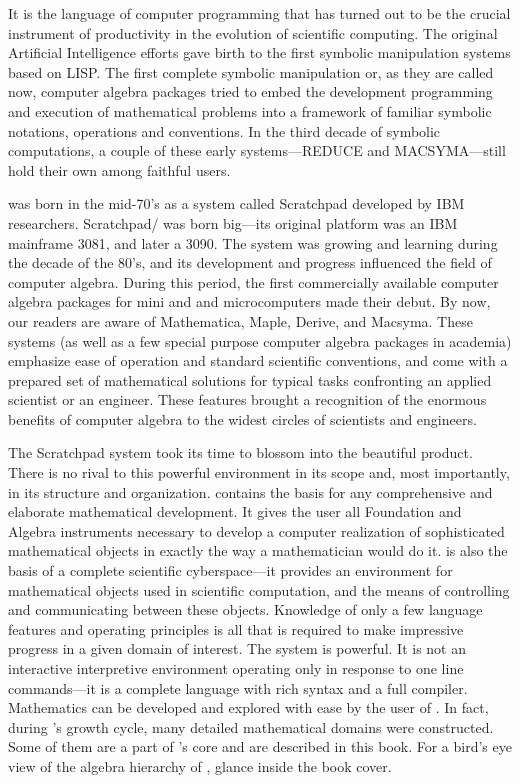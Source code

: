 It is the language of computer programming that has turned out to
be the crucial instrument of productivity in the evolution of
scientific computing.
The original Artificial Intelligence efforts gave birth to the
first symbolic manipulation systems based on LISP.
The first complete symbolic manipulation or, as they are called
now, computer algebra packages tried to embed the development
programming and execution of mathematical problems into a
framework of familiar symbolic notations, operations and
conventions.
In the third decade of symbolic computations, a couple of these
early systems---REDUCE and MACSYMA---still hold their own among
faithful users.

\Language{} was born in the mid-70's as a system called Scratchpad
developed by IBM researchers.
Scratchpad/\Language{} was born big---its original platform was an
IBM mainframe 3081, and later a 3090.
The system was growing and learning during the decade of the 80's,
and its development and progress influenced the field of computer
algebra.
During this period, the first commercially available computer
algebra packages for mini and and microcomputers made their debut.
By now, our readers are aware of Mathematica, Maple, Derive, and
Macsyma.
These systems (as well as a few special purpose computer algebra
packages in academia) emphasize ease of operation and standard
scientific conventions, and come with a prepared set of
mathematical solutions for typical tasks confronting an applied
scientist or an engineer.
These features brought a recognition of the enormous benefits of
computer algebra to the widest circles of scientists and
engineers.

The Scratchpad system took its time to blossom into the beautiful
\Language{} product.
There is no rival to this powerful environment in its scope and,
most importantly, in its structure and organization.
\Language{} contains the basis for any comprehensive and elaborate
mathematical development.
It gives the user all Foundation and Algebra instruments necessary
to develop a computer realization of sophisticated mathematical
objects in exactly the way a mathematician would do it.
\Language{} is also the basis of a complete scientific
cyberspace---it provides an environment for mathematical objects
used in scientific computation, and the means of controlling and
communicating between these objects.
Knowledge of only a few \Language{} language features and
operating principles is all that is required to make impressive
progress in a given domain of interest.
The system is powerful.
It is not an interactive interpretive environment operating only
in response to one line commands---it is a complete language with
rich syntax and a full compiler.
Mathematics can be developed and explored with ease by the user of
\Language{}.
In fact, during \Language{}'s growth cycle, many detailed
mathematical domains were constructed.
Some of them are a part of \Language{}'s core and are described in
this book.
For a bird's eye view of the algebra hierarchy of \Language{},
glance inside the book cover.

